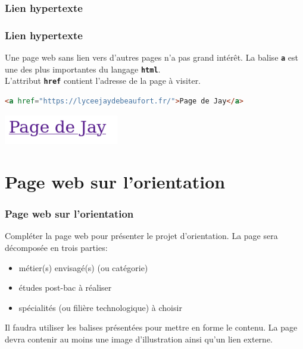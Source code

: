 \documentclass[svgnames,11pt]{beamer}
\begin{document}
\subsubsection{Lien hypertexte}
\begin{frame}[fragile]
    \frametitle{Lien hypertexte}

    Une page web sans lien vers d'autres pages n'a pas grand intérêt. La balise \textbf{\texttt{a}} est une des plus importantes du langage \textbf{\texttt{html}}.\\L'attribut \textbf{\texttt{href}} contient l'adresse de la page à visiter.
    \begin{center}
        \begin{lstlisting}[language=html , basicstyle=\ttfamily\small, xleftmargin=0.1em, xrightmargin=-1.8em]
<a href="https://lyceejaydebeaufort.fr/">Page de Jay</a>
\end{lstlisting}
    \end{center}

    \begin{center}
        \centering
        \includegraphics[width=5cm]{ressources/lien.png}
    \end{center}

\end{frame}
\section{Page web sur l'orientation}
\begin{frame}
    \frametitle{Page web sur l'orientation}

    \begin{activite}
    Compléter la page web pour présenter le projet d'orientation. La page sera décomposée en trois parties:
    \begin{itemize}
        \item métier(s) envisagé(s) (ou catégorie)
        \item études post-bac à réaliser
        \item spécialités (ou filière technologique) à choisir
    \end{itemize}
    Il faudra utiliser les balises présentées pour mettre en forme le contenu. La page devra contenir au moins une image d'illustration ainsi qu'un lien externe.
    \end{activite}

\end{frame}
\end{document}
